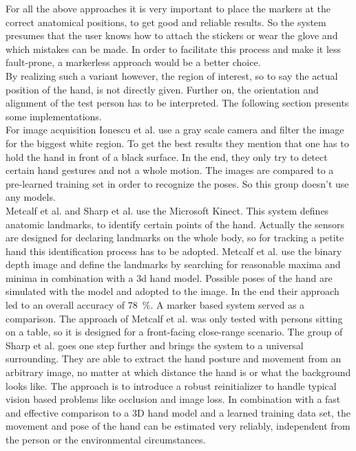 For all the above approaches it is very important to place the markers at the correct anatomical positions, to get good and reliable results. So the system presumes that the user knows how to attach the stickers or wear the glove and which mistakes can be made. In order to facilitate this process and make it less fault-prone, a markerless approach would be a better choice.\\
By realizing such a variant however, the region of interest, so to say the actual position of the hand, is not directly given. Further on, the orientation and alignment of the test person has to be interpreted. The following section presents some implementations.\\
For image acquisition Ionescu et al. use a gray scale camera and filter the image for the biggest white region. To get the best results they mention that one has to hold the hand in front of a black surface. In the end, they only try to detect certain hand gestures and not a whole motion. The images are compared to a pre-learned training set in order to recognize the poses. So this group doesn't use any models.\\
Metcalf et al. and Sharp et al. use the Microsoft Kinect. This system defines anatomic landmarks, to identify certain points of the hand. Actually the sensors are designed for declaring landmarks on the whole body, so for tracking a petite hand this identification process has to be adopted. Metcalf et al. use the binary depth image and define the landmarks by searching for reasonable maxima and minima in combination with a 3d hand model. Possible poses of the hand are simulated with the model and adopted to the image. In the end their approach led to an overall accuracy of \SI{78}{\percent}. A marker based system served as a comparison. The approach of Metcalf et al. was only tested with persons sitting on a table, so it is designed for a front-facing close-range scenario.  The group of Sharp et al. goes one step further and brings the system to a universal surrounding. They are able to extract the hand posture and movement from an arbitrary image, no matter at which distance the hand is or what the background looks like. The approach is to introduce a robust reinitializer to handle typical vision based problems like occlusion and image loss. In combination with a fast and effective comparison to a 3D hand model and a learned training data set, the movement and pose of the hand can be estimated very reliably, independent from the person or the environmental circumstances.\\
